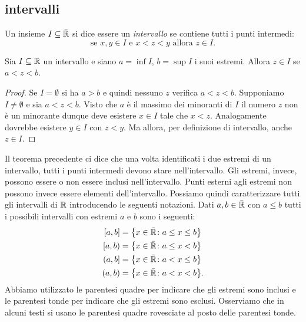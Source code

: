 \subsection{intervalli}

\begin{definition}[intervallo]
\label{def:intervallo}%
%
%
Un insieme $I\subseteq \bar{{\mathbb R}}$ si dice essere un \emph{intervallo}
se contiene tutti i punti intermedi:
\[
  \text{se $x, y \in I$ e $x<z<y$ allora $z \in I$.}
\]
\end{definition}
%
\begin{theorem}
Sia $I\subseteq {\mathbb R}$ un intervallo e siano $a=\inf I$, $b=\sup I$
i suoi estremi. Allora
$z\in I$ se $a < z < b$.
\end{theorem}
%
\begin{proof}
Se $I=\emptyset$ si ha $a>b$ e quindi nessuno $z$ verifica $a<z<b$.
Supponiamo $I\neq \emptyset$ e
sia $a < z < b$.
Visto che $a$ è il massimo dei minoranti di $I$
il numero $z$ non è un minorante dunque
deve esistere $x \in I$ tale
che $x < z$. Analogamente dovrebbe esistere $y\in I$
con $z<y$.
Ma allora, per definizione di intervallo, anche $z\in I$.
\end{proof}

Il teorema precedente ci dice che una volta identificati i due estremi
di un intervallo, tutti i punti intermedi devono stare nell'intervallo.
Gli estremi, invece, possono essere o non essere inclusi nell'intervallo.
Punti esterni agli estremi non possono invece essere elementi dell'intervallo.
Possiamo quindi caratterizzare tutti gli intervalli di ${\mathbb R}$
introducendo le seguenti notazioni. Dati $a,b\in \bar {{\mathbb R}}$ con $a\le b$
tutti i possibili intervalli con estremi $a$ e $b$ sono i seguenti:
\begin{equation}\label{eq:499494}
\begin{aligned}
\left[a,b\right] &= {\left\{ x\in \bar {{\mathbb R}}\colon a \le x \le b \right\}} \\
\left[a,b\right) &= {\left\{ x\in \bar {{\mathbb R}}\colon a \le x < b \right\}} \\
\left(a,b\right] &= {\left\{ x\in \bar {{\mathbb R}}\colon a < x \le b \right\}}\\
\left(a,b\right) &= {\left\{ x\in \bar {{\mathbb R}}\colon a < x < b \right\}}.
\end{aligned}
\end{equation}
Abbiamo utilizzato le parentesi quadre per indicare che gli estremi
sono inclusi e le parentesi tonde per indicare che gli estremi sono esclusi.
Osserviamo che in alcuni testi si usano le parentesi quadre rovesciate al posto
delle parentesi tonde.

